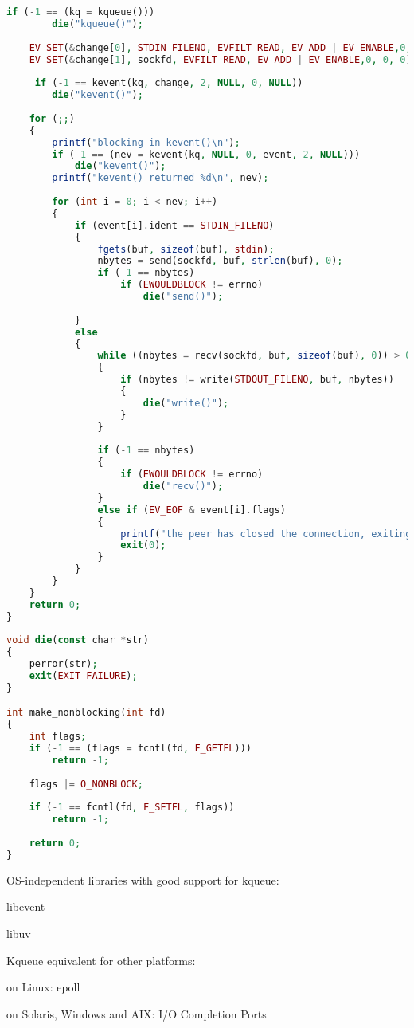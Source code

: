 \begin{lstlisting}[language=PHP]
	if (-1 == (kq = kqueue()))
		die("kqueue()");
 
	EV_SET(&change[0], STDIN_FILENO, EVFILT_READ, EV_ADD | EV_ENABLE,0, 0, 0);
	EV_SET(&change[1], sockfd, EVFILT_READ, EV_ADD | EV_ENABLE,0, 0, 0);
	 
	 if (-1 == kevent(kq, change, 2, NULL, 0, NULL))
	 	die("kevent()");
 
	for (;;)
	{
		printf("blocking in kevent()\n");
		if (-1 == (nev = kevent(kq, NULL, 0, event, 2, NULL)))
			die("kevent()");		
		printf("kevent() returned %d\n", nev); 
		
		for (int i = 0; i < nev; i++)
		{
			if (event[i].ident == STDIN_FILENO)
			{
				fgets(buf, sizeof(buf), stdin);
				nbytes = send(sockfd, buf, strlen(buf), 0);
				if (-1 == nbytes)
					if (EWOULDBLOCK != errno)
						die("send()");
 
			}
			else
			{
				while ((nbytes = recv(sockfd, buf, sizeof(buf), 0)) > 0)
				{					
					if (nbytes != write(STDOUT_FILENO, buf, nbytes))
					{
						die("write()");
					}
				}
 
				if (-1 == nbytes)
				{
					if (EWOULDBLOCK != errno)
						die("recv()");
				}
				else if (EV_EOF & event[i].flags)
				{
					printf("the peer has closed the connection, exiting...\n");
					exit(0);
				}				
			} 
		} 
	} 
	return 0;
}
 
void die(const char *str)
{
	perror(str);
	exit(EXIT_FAILURE);
}

int make_nonblocking(int fd)
{
	int flags;
	if (-1 == (flags = fcntl(fd, F_GETFL)))
		return -1;
	
	flags |= O_NONBLOCK;
	
	if (-1 == fcntl(fd, F_SETFL, flags))
		return -1;
	
	return 0;	
}
\end{lstlisting}

OS-independent libraries with good support for kqueue:

\begin{compactitem}
\item libevent
\item libuv
\end{compactitem}

Kqueue equivalent for other platforms:

\begin{compactitem}
\item on Linux: epoll
\item on Solaris, Windows and AIX: I/O Completion Ports
\end{compactitem}




